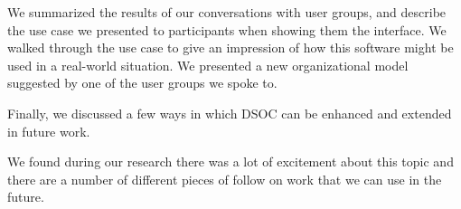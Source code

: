 \documentclass[journal]{vgtc}                %
\begin{document}
We summarized the results of our conversations with user groups, and describe the use case we presented to participants when showing them the interface. We walked through the use case to give an impression of how this software might be used in a real-world situation. We presented a new organizational model suggested by one of the user groups we spoke to.

Finally, we discussed a few ways in which DSOC can be enhanced and extended in future work.

We found during our research there was a lot of excitement about this topic and there are a number of different pieces of follow on work that we can use in the future.




\end{document}
